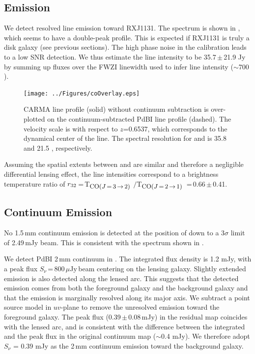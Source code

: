 \documentclass[]{emulateapj}
\begin{document}
\subsection{\cco Emission} %
We detect resolved \cco line emission toward RXJ1131. The spectrum is shown in
, which seems to have a double-peak profile.
This is expected if RXJ1131 is truly a disk galaxy (see previous
sections). The high phase noise in the calibration leads to a low SNR
detection. We thus estimate the line intensity to be
35.7\,$\pm$\,21.9 Jy\,\kms by summing up fluxes over the FWZI
linewidth used to infer \bco line intensity ($\sim$700 \kms).

\begin{figure}[!Htbp]
\centering
\texttt{[image: ../Figures/coOverlay.eps]}
\caption{CARMA \cco line profile (solid) without continuum subtraction is
over-plotted on the continuum-subtracted PdBI \bco line profile (dashed).
The velocity scale is with respect to $z$=0.6537, which corresponds to the
dynamical center of the \bco line. The spectral resolution for \cco and \bco
is 35.8 \kms and 21.5 \kms, respectively.
 \label{fig:co32spec}}
\end{figure}

Assuming the spatial extents between \bco and \cco are similar and therefore
a negligible differential lensing effect, the line intensities
correspond to a brightness temperature ratio of
$r_{\rm 32}$\,=\,T$_{\small \mbox{CO($J$\,=\,3\,$\rightarrow$\,2) }}$$/$T$_{\small \mbox{CO($J$\,=\,2\,$\rightarrow$\,1) }}$\,=\,0.66\,$\pm$\,0.41.

\subsection{Continuum Emission} %
No 1.5\,mm continuum emission is detected at the position of \cco
down to a 3$\sigma$ limit of 2.49\,mJy beam\pmOne.
This is consistent with the spectrum shown in .

We detect PdBI 2\,mm continuum in . The integrated flux density is
1.2 mJy, with a peak flux
$S_\nu$\,=\,800\,$\mu$Jy\,beam\pmOne
centering on the lensing galaxy. Slightly extended emission is also detected
along the lensed arc. This suggests that the detected emission comes from
both the foreground galaxy and the background galaxy and that the
emission is marginally resolved along its major axis.
We subtract a point source model in $uv$-plane to remove the unresolved
emission toward the foreground galaxy. The peak flux (0.39\,$\pm$\,0.08\,mJy)
in the residual map coincides with the lensed arc, and is consistent with
the difference between the integrated and the peak flux in the
original continuum map ($\sim$0.4 mJy). We therefore adopt
$S_\nu$ = 0.39 mJy as the 2\,mm continuum emission toward
the background galaxy.
\end{document}
